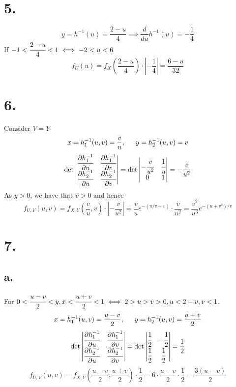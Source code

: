 \documentclass[11pt]{article}
\begin{document}
\section*{5.}
\[
    y = h^{-1}(u) = \frac{2-u}{4} \implies \frac{d}{du}h^{-1}(u) = -\frac{1}{4}    
\]
If $-1<\cfrac{2-u}{4}< 1 \iff -2<u<6$
\[
    f_U(u) = f_X\left(\frac{2-u}{4}\right) \cdot \left|-\frac{1}{4}\right| = \frac{6-u}{32} 
\]
\pagebreak
\section*{6.}
Consider $V=Y$
\[
    x = h_1^{-1}(u,v) = \frac{v}{u}, \indent  y = h_2^{-1}(u,v) = v
\]
\[
    \det 
    \begin{vmatrix}
        \cfrac{\partial h_1^{-1}}{\partial u} & \cfrac{\partial h_1^{-1}}{\partial v} \\
        \cfrac{\partial h_2^{-1}}{\partial u} & \cfrac{\partial h_2^{-1}}{\partial v}
    \end{vmatrix}    
    = 
    \det 
    \begin{vmatrix}
        -\cfrac{v}{u^2} & \cfrac{1}{u} \\
        0 & 1 
    \end{vmatrix}
    = -\frac{v}{u^2}
\]
As $y>0$, we have that $v>0$ and hence 
\[
    f_{U,V}(u,v) = f_{X,Y}\left(\frac{v}{u}, v\right) \cdot \left| -\frac{v}{u^2} \right| =  
    \frac{v}{u} e^{-(u/v + v)} \cdot \frac{v}{u^2} = \frac{v^2}{u^3}e^{-(u+v^2)/v} 
\]
\pagebreak
\section*{7.}
\subsection*{a.}
For $0<\cfrac{u-v}{2}<y, x<\cfrac{u+v}{2}<1 \iff 2>u>v>0, u<2-v, v<1$.
\[
    x = h_1^{-1}(u,v) = \frac{u-v}{2}, \indent y = h_2^{-1}(u,v) = \frac{u+v}{2}    
\]
\[
    \det 
    \begin{vmatrix}
        \cfrac{\partial h_1^{-1}}{\partial u} & \cfrac{\partial h_1^{-1}}{\partial v} \\
        \cfrac{\partial h_2^{-1}}{\partial u} & \cfrac{\partial h_2^{-1}}{\partial v}
    \end{vmatrix}    
    = 
    \det 
    \begin{vmatrix}
        \cfrac{1}{2} & -\cfrac{1}{2} \\
        \cfrac{1}{2} & \cfrac{1}{2} 
    \end{vmatrix}
    = \frac{1}{2}
\]
\[
    f_{U,V}(u,v) = f_{X,Y}\left( \frac{u-v}{2}, \frac{u+v}{2}\right) \cdot \frac{1}{2} 
    = 6 \cdot \frac{u-v}{2} \cdot \frac{1}{2} = \frac{3(u-v)}{2}     
\]
\end{document}

